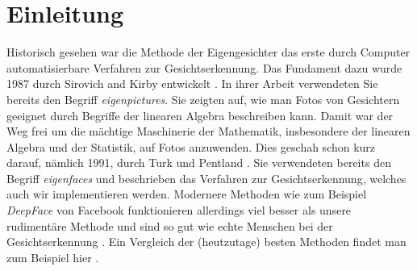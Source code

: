 \section*{Einleitung}
Historisch gesehen war die Methode der Eigengesichter das erste durch Computer automatisierbare Verfahren zur Gesichtserkennung.
Das Fundament dazu wurde 1987 durch Sirovich and Kirby entwickelt \cite{SirovichKirby1987}.
In ihrer Arbeit verwendeten Sie bereits den Begriff \textit{eigenpictures}.
Sie zeigten auf, wie man Fotos von Gesichtern geeignet durch Begriffe der linearen Algebra beschreiben kann.
Damit war der Weg frei um die mächtige Maschinerie der Mathematik, insbesondere der linearen Algebra und der Statistik, auf Fotos anzuwenden.
Dies geschah schon kurz darauf, nämlich 1991, durch Turk und Pentland \cite{Turk1991}.
Sie verwendeten bereits den Begriff \textit{eigenfaces} und beschrieben das Verfahren zur Gesichtserkennung, welches auch wir implementieren werden.
Modernere Methoden wie zum Beispiel \textit{DeepFace} von Facebook funktionieren allerdings viel besser als unsere rudimentäre Methode und sind so gut wie echte Menschen bei der Gesichtserkennung \cite{Taigman2014}.
Ein Vergleich der (heutzutage) besten Methoden findet man zum Beispiel hier \cite{Taskiran2020}.

